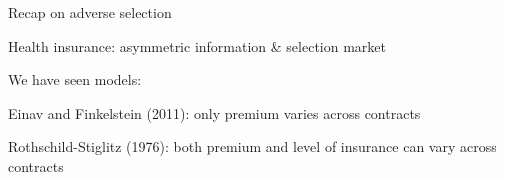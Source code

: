 \begin{frame}{Recap on adverse selection}

    Health insurance: asymmetric information \& selection market\\
    \vspace{3mm}

    We have seen  models:
    \begin{enumerate}
        \item Einav and Finkelstein (2011): only premium varies across contracts
        {\color{white}\item[] Rothschild-Stiglitz (1976): both premium and level of insurance can vary across contracts}
    \end{enumerate}

\end{frame}
